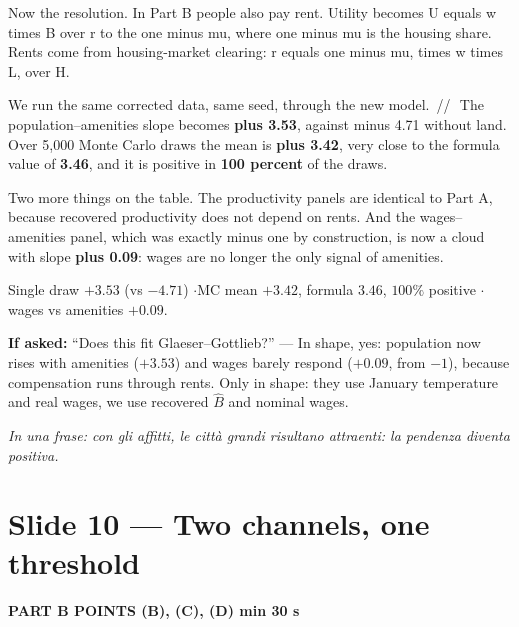 \documentclass[11pt,a4paper]{article}
\newcommand{\slide}[3]{\Needspace{14\baselineskip}\section{#1}\textcolor{unicared}{\small\bfseries\MakeUppercase{#3}\quad\textperiodcentered\quad #2}\par}
\newcommand{\idea}[1]{\par{\small\itshape\color{unicablue}In una frase: #1}\par}
\newcommand{\pause}{\textcolor{unicared}{\,/\!/\,}}
\begin{document}
\begin{say}
Now the resolution. In Part B people also pay rent. Utility becomes U equals w times B over r to the one minus mu, where one minus mu is the housing share. Rents come from housing-market clearing: r equals one minus mu, times w times L, over H.

We run the same corrected data, same seed, through the new model. \pause\ The population--amenities slope becomes \textbf{plus 3.53}, against minus 4.71 without land. Over 5,000 Monte Carlo draws the mean is \textbf{plus 3.42}, very close to the formula value of \textbf{3.46}, and it is positive in \textbf{100 percent} of the draws.

Two more things on the table. The productivity panels are identical to Part A, because recovered productivity does not depend on rents. And the wages--amenities panel, which was exactly minus one by construction, is now a cloud with slope \textbf{plus 0.09}: wages are no longer the only signal of amenities.
\end{say}

\begin{nums}
Single draw $+3.53$ (vs $-4.71$) \quad$\cdot$\quad MC mean $+3.42$, formula $3.46$, $100\%$ positive \quad$\cdot$\quad wages vs amenities $+0.09$.
\end{nums}
\begin{ask}
\textbf{If asked:} ``Does this fit Glaeser--Gottlieb?'' --- In shape, yes: population now rises with amenities ($+3.53$) and wages barely respond ($+0.09$, from $-1$), because compensation runs through rents. Only in shape: they use January temperature and real wages, we use recovered $\hat B$ and nominal wages.
\end{ask}
\idea{con gli affitti, le città grandi risultano attraenti: la pendenza diventa positiva.}

\slide{Slide 10 --- Two channels, one threshold}{1 min 30 s}{Part B \textperiodcentered{} points (b), (c), (d)}
\end{document}

